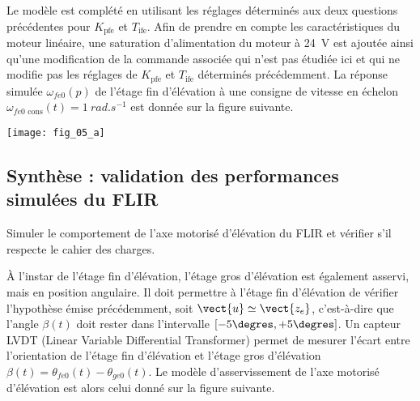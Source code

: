 Le modèle est complété en utilisant les réglages déterminés aux deux questions précédentes pour $K_{\text{pfe}}$ et $T_{\text{ife}}$. Afin de
prendre en compte les caractéristiques du moteur linéaire, une saturation d’alimentation du moteur à \SI{24}{V} est
ajoutée ainsi qu’une modification de la commande associée qui n’est pas étudiée ici et qui ne modifie pas les
réglages de $K_{\text{pfe}}$ et $T_{\text{ife}}$ déterminés précédemment. La réponse simulée $\omega_{fe0}(p)$ de l’étage fin d’élévation à une
consigne de vitesse en échelon $\omega_{fe0 \text{ cons}}(t) = \SI{1}{rad.s^{-1}}$ est donnée sur la figure suivante.

\begin{center}
\texttt{[image: fig\_05\_a]}
\end{center}




\ifprof
\begin{corrige}
\end{corrige}
\else
\fi

\subsection*{Synthèse : validation des performances simulées du FLIR}
\begin{obj}
Simuler le comportement de l’axe motorisé d’élévation du FLIR et vérifier s’il respecte le cahier des
charges.
\end{obj}



À l’instar de l’étage fin d’élévation, l’étage gros d’élévation est également asservi, mais en position angulaire. Il
doit permettre à l’étage fin d’élévation de vérifier l’hypothèse émise précédemment, soit $\vect{u}\simeq \vect{z_e}$, c’est-à-dire que l’angle $\beta(t)$ doit rester dans l’intervalle $[-5\degres, +5\degres]$.
Un capteur LVDT (Linear Variable Differential Transformer) permet de mesurer l’écart entre l’orientation de
l’étage fin d’élévation et l’étage gros d’élévation $\beta(t)=\theta_{fe0}(t)-\theta_{ge0}(t)$. Le modèle d’asservissement de l’axe
motorisé d’élévation est alors celui donné sur la figure suivante. 

